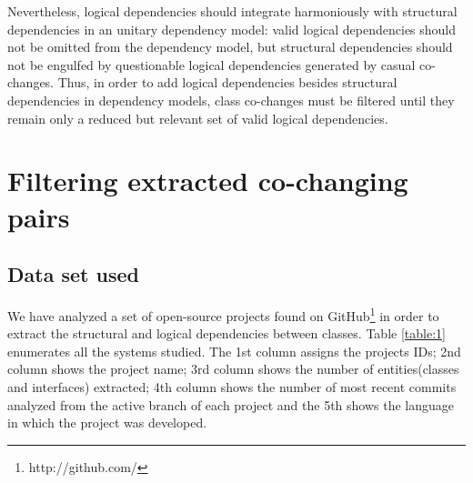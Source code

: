 \documentclass[12pt]{mitthesis}
\begin{document}
Nevertheless, logical dependencies should integrate harmoniously with structural dependencies in an unitary dependency model: valid logical dependencies should not be omitted from the dependency model, but structural dependencies should not be engulfed by questionable logical dependencies generated by casual co-changes.  
Thus, in order to add logical dependencies besides structural dependencies in dependency models, class co-changes must be filtered until they remain only a reduced but relevant set of valid logical dependencies. 



\chapter {Filtering extracted co-changing pairs}

\section{Data set used}
\label{sec:dataset}
We have analyzed a set of open-source projects found on GitHub\footnote{http://github.com/} \cite{Kalliamvakou2016} in order to extract the structural and logical dependencies between classes. Table \ref{table:1} enumerates all the systems studied. The 1st column assigns the projects IDs; 2nd column shows the project name; 3rd column shows the number of entities(classes and interfaces) extracted; 4th column shows the number of most recent commits analyzed from the active branch of each project and the 5th shows the language in which the project was developed.
\end{document}
